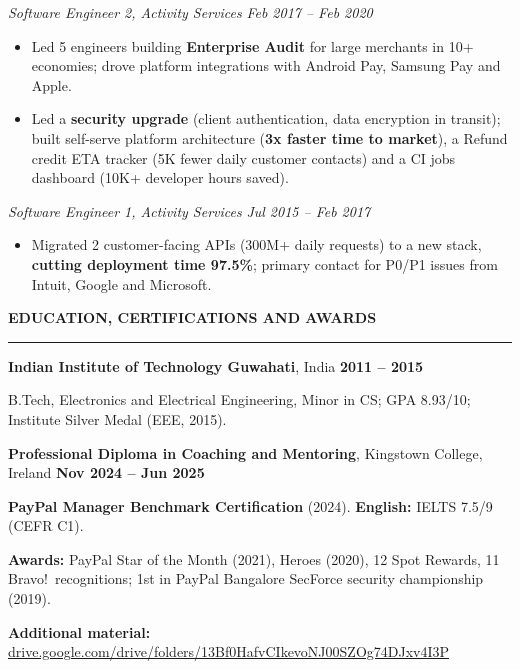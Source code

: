 \documentclass[10pt,a4paper]{article}
\newcommand{\bd}[1]{\textbf{#1}}
\newcommand{\sect}[1]{%
  \par\vspace{4pt}%
  {\bfseries\fontsize{10}{11.5}\selectfont #1}\par\nointerlineskip
  \vspace{1pt}\noindent\rule{\linewidth}{0.6pt}\par\vspace{2.5pt}}
\newcommand{\role}[2]{%
  \par\vspace{2pt}\noindent\textcolor{rolecolor}{\textit{#1}}\hfill
  \textcolor{rolecolor}{\textit{#2}}\par\nopagebreak}
\begin{document}
\role{Software Engineer 2, Activity Services}{Feb 2017 -- Feb 2020}
\begin{itemize}
\item Led 5 engineers building \bd{Enterprise Audit} for large merchants in 10+ economies;
  drove platform integrations with Android Pay, Samsung Pay and Apple.
\item Led a \bd{security upgrade} (client authentication, data encryption in transit); built
  self-serve platform architecture (\bd{3x faster time to market}), a Refund credit ETA tracker
  (5K fewer daily customer contacts) and a CI jobs dashboard (10K+ developer hours saved).
\end{itemize}

\role{Software Engineer 1, Activity Services}{Jul 2015 -- Feb 2017}
\begin{itemize}
\item Migrated 2 customer-facing APIs (300M+ daily requests) to a new stack, \bd{cutting
  deployment time 97.5\%}; primary contact for P0/P1 issues from Intuit, Google and Microsoft.
\end{itemize}

\sect{EDUCATION, CERTIFICATIONS AND AWARDS}
\noindent\textbf{Indian Institute of Technology Guwahati}, India \hfill \textbf{2011 -- 2015}\par
B.Tech, Electronics and Electrical Engineering, Minor in CS; GPA 8.93/10;
Institute Silver Medal (EEE, 2015).\par
\vspace{1.5pt}
\noindent\textbf{Professional Diploma in Coaching and Mentoring}, Kingstown College, Ireland
\hfill \textbf{Nov 2024 -- Jun 2025}\par
\noindent\textbf{PayPal Manager Benchmark Certification} (2024). \textbf{English:} IELTS 7.5/9 (CEFR C1).\par
\vspace{1.5pt}
\noindent\textbf{Awards:} PayPal Star of the Month (2021), Heroes (2020), 12 Spot Rewards,
11 Bravo!\ recognitions; 1st in PayPal Bangalore SecForce security championship (2019).

\par\vspace{1.5pt}
\noindent\textbf{Additional material:}
\href{https://drive.google.com/drive/folders/13Bf0HafvCIkevoNJ00SZOg74DJxv4I3P}{drive.google.com/drive/folders/13Bf0HafvCIkevoNJ00SZOg74DJxv4I3P}
\end{document}
